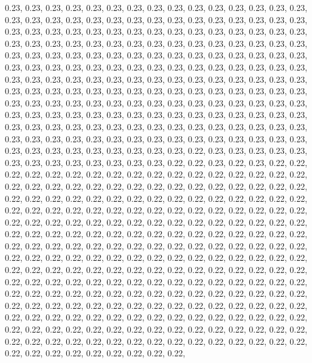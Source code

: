\documentclass[11pt,]{article}
\begin{document}
0.23, 0.23, 0.23, 0.23, 0.23, 0.23, 0.23, 0.23, 0.23, 0.23, 0.23, 0.23,
0.23, 0.23, 0.23, 0.23, 0.23, 0.23, 0.23, 0.23, 0.23, 0.23, 0.23, 0.23,
0.23, 0.23, 0.23, 0.23, 0.23, 0.23, 0.23, 0.23, 0.23, 0.23, 0.23, 0.23,
0.23, 0.23, 0.23, 0.23, 0.23, 0.23, 0.23, 0.23, 0.23, 0.23, 0.23, 0.23,
0.23, 0.23, 0.23, 0.23, 0.23, 0.23, 0.23, 0.23, 0.23, 0.23, 0.23, 0.23,
0.23, 0.23, 0.23, 0.23, 0.23, 0.23, 0.23, 0.23, 0.23, 0.23, 0.23, 0.23,
0.23, 0.23, 0.23, 0.23, 0.23, 0.23, 0.23, 0.23, 0.23, 0.23, 0.23, 0.23,
0.23, 0.23, 0.23, 0.23, 0.23, 0.23, 0.23, 0.23, 0.23, 0.23, 0.23, 0.23,
0.23, 0.23, 0.23, 0.23, 0.23, 0.23, 0.23, 0.23, 0.23, 0.23, 0.23, 0.23,
0.23, 0.23, 0.23, 0.23, 0.23, 0.23, 0.23, 0.23, 0.23, 0.23, 0.23, 0.23,
0.23, 0.23, 0.23, 0.23, 0.23, 0.23, 0.23, 0.23, 0.23, 0.23, 0.23, 0.23,
0.23, 0.23, 0.23, 0.23, 0.23, 0.23, 0.23, 0.23, 0.23, 0.23, 0.23, 0.23,
0.23, 0.23, 0.23, 0.23, 0.23, 0.23, 0.23, 0.23, 0.23, 0.23, 0.23, 0.23,
0.23, 0.23, 0.23, 0.23, 0.23, 0.23, 0.23, 0.23, 0.23, 0.23, 0.23, 0.23,
0.23, 0.23, 0.23, 0.23, 0.23, 0.23, 0.23, 0.23, 0.23, 0.23, 0.23, 0.23,
0.23, 0.23, 0.23, 0.23, 0.23, 0.23, 0.23, 0.23, 0.23, 0.22, 0.23, 0.23,
0.23, 0.23, 0.23, 0.23, 0.23, 0.23, 0.23, 0.23, 0.23, 0.23, 0.23, 0.22,
0.22, 0.23, 0.22, 0.23, 0.22, 0.22, 0.22, 0.22, 0.22, 0.22, 0.22, 0.22,
0.22, 0.22, 0.22, 0.22, 0.22, 0.22, 0.22, 0.22, 0.22, 0.22, 0.22, 0.22,
0.22, 0.22, 0.22, 0.22, 0.22, 0.22, 0.22, 0.22, 0.22, 0.22, 0.22, 0.22,
0.22, 0.22, 0.22, 0.22, 0.22, 0.22, 0.22, 0.22, 0.22, 0.22, 0.22, 0.22,
0.22, 0.22, 0.22, 0.22, 0.22, 0.22, 0.22, 0.22, 0.22, 0.22, 0.22, 0.22,
0.22, 0.22, 0.22, 0.22, 0.22, 0.22, 0.22, 0.22, 0.22, 0.22, 0.22, 0.22,
0.22, 0.22, 0.22, 0.22, 0.22, 0.22, 0.22, 0.22, 0.22, 0.22, 0.22, 0.22,
0.22, 0.22, 0.22, 0.22, 0.22, 0.22, 0.22, 0.22, 0.22, 0.22, 0.22, 0.22,
0.22, 0.22, 0.22, 0.22, 0.22, 0.22, 0.22, 0.22, 0.22, 0.22, 0.22, 0.22,
0.22, 0.22, 0.22, 0.22, 0.22, 0.22, 0.22, 0.22, 0.22, 0.22, 0.22, 0.22,
0.22, 0.22, 0.22, 0.22, 0.22, 0.22, 0.22, 0.22, 0.22, 0.22, 0.22, 0.22,
0.22, 0.22, 0.22, 0.22, 0.22, 0.22, 0.22, 0.22, 0.22, 0.22, 0.22, 0.22,
0.22, 0.22, 0.22, 0.22, 0.22, 0.22, 0.22, 0.22, 0.22, 0.22, 0.22, 0.22,
0.22, 0.22, 0.22, 0.22, 0.22, 0.22, 0.22, 0.22, 0.22, 0.22, 0.22, 0.22,
0.22, 0.22, 0.22, 0.22, 0.22, 0.22, 0.22, 0.22, 0.22, 0.22, 0.22, 0.22,
0.22, 0.22, 0.22, 0.22, 0.22, 0.22, 0.22, 0.22, 0.22, 0.22, 0.22, 0.22,
0.22, 0.22, 0.22, 0.22, 0.22, 0.22, 0.22, 0.22, 0.22, 0.22, 0.22, 0.22,
0.22, 0.22, 0.22, 0.22, 0.22, 0.22, 0.22, 0.22, 0.22, 0.22, 0.22, 0.22,
0.22, 0.22, 0.22, 0.22, 0.22, 0.22, 0.22, 0.22, 0.22, 0.22, 0.22, 0.22,
0.22, 0.22, 0.22, 0.22, 0.22, 0.22, 0.22, 0.22, 0.22, 0.22, 0.22, 0.22,
\end{document}
